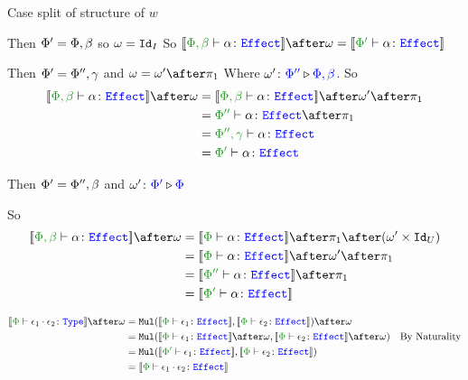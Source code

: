 {Case split of structure of $w$

\subcase{$\w=\i$}
Then $\Phi' = \Phi,\beta$ so $\omega=\texttt{Id}_{I}$
So $\deno{\typerelation{\P,\b}{\a}{\effect}}\after\w = \deno{\typerelation{\P'}{\a}{\effect}}$

Then $\Phi' = \Phi'',\gamma$ and $\w=\w'\after\p$
Where $\omega' \colon {\color{blue}\Phi''} \triangleright {\color {blue} \Phi,\beta}$.
So
\begin{align}
    \deno{\typerelation{\P,\b}{\a}{\effect}}\after\w & = \deno{\typerelation{\P,\b}{\a}{\effect}}\after\w'\after\p\\
    & = {\typerelation{\P''}{\a}{\effect}}\after\p\\
    & = {\typerelation{\P'',\g}{\a}{\effect}}\\
    & = {\typerelation{\P'}{\a}{\effect}}\\
\end{align}

Then $\Phi'=\Phi'',\beta$ and $\omega' \colon {\color{blue}\Phi'} \triangleright {\color {blue} \Phi}$

So \begin{align}
    \deno{\typerelation{\P,\b}{\a}{\effect}}\after\w &= \deno{\typerelation{\P}{\a}{\effect}}\after\p\after(\w'\times\Id{U})\\
    &=\deno{\typerelation{\P}{\a}{\effect}}\after\w'\after\p\\
    & = \deno{\typerelation{\P''}{\a}{\effect}}\after\p\\
    & = \deno{\typerelation{\P'}{\a}{\effect}}\\
\end{align}

\begin{align}
    \deno{\typerelation{\P}{\e_1\dot\e_2}{\type}} \after\w &=
    \Mul(\deno{\typerelation{\P}{\e_1}{\effect}}, \deno{\typerelation{\P}{\e_2}{\effect}})\after \w \\
    & = \Mul(\deno{\typerelation{\P}{\e_1}{\effect}}\after \w, \deno{\typerelation{\P}{\e_2}{\effect}}\after \w)\qt{By Naturality}\\
    & = \Mul(\deno{\typerelation{\P'}{\e_1}{\effect}}, \deno{\typerelation{\P}{\e_2}{\effect}})\\
    & = \deno{\typerelation{\P}{\e_1\dot\e_2}{\effect}}
\end{align}
}


